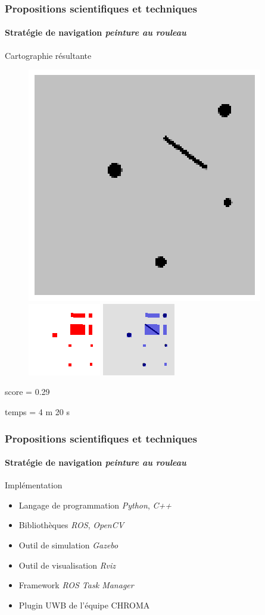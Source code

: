 \documentclass{beamer}
\begin{document}
			\begin{frame}
				\frametitle{Propositions scientifiques et techniques}
				\framesubtitle{Stratégie de navigation \textit{peinture au rouleau}}
				Cartographie résultante
				\begin{figure}
					\centering
					\includegraphics[width=0.3\linewidth]{graphics/test_05_flip.png}
					\includegraphics[width=0.3\linewidth]{graphics/occupancy_grid_example_par.png}
					\includegraphics[width=0.3\linewidth]{graphics/both_example_par.png}
				\end{figure}
				score = 0.29

				temps = 4 m 20 s
			\end{frame}
			\begin{frame}
				\frametitle{Propositions scientifiques et techniques}
				\framesubtitle{Stratégie de navigation \textit{peinture au rouleau}}
				Implémentation
				\begin{itemize}
					\item Langage de programmation \textit{Python}, \textit{C++}
					\item Bibliothèques \textit{ROS}, \textit{OpenCV}
					\item Outil de simulation \textit{Gazebo}
					\item Outil de visualisation \textit{Rviz}
					\item Framework \textit{ROS Task Manager}
					\item Plugin UWB de l'équipe CHROMA
				\end{itemize}
			\end{frame}
\end{document}
